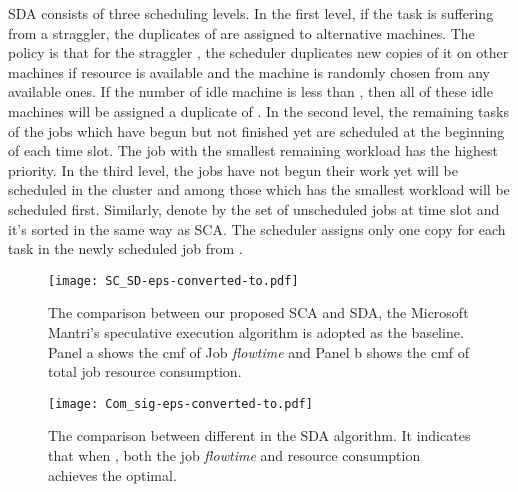 \documentclass[10pt,conference]{IEEEtran}
\begin{document}
SDA consists of three scheduling levels. In the  first level, if the task  is suffering from a straggler, the duplicates of  are assigned to alternative machines. The policy is that for the straggler  , the scheduler duplicates  new copies of it on other machines if resource is available and the machine is randomly chosen from any available ones. If the number of idle machine is less than , then all of these idle machines will be assigned a duplicate of . In the second level, the remaining tasks of the jobs which have begun but not finished yet are scheduled at the beginning of each time slot. The job with the smallest remaining workload has the highest priority. In the third level, the jobs have not begun their work yet will be scheduled in the cluster and among those which has the smallest workload will be scheduled first. Similarly, denote by  the set of unscheduled jobs at time slot  and it's sorted in the same way as SCA. The scheduler assigns only one copy for each task in the newly scheduled job from .


\begin{figure}
\centering
\texttt{[image: SC\_SD-eps-converted-to.pdf]}
\caption{The comparison between our proposed SCA and SDA, the Microsoft Mantri's speculative execution algorithm is adopted as the baseline.  Panel a shows the cmf of Job \textit{flowtime} and Panel b shows the cmf of total job resource consumption. }
\label{SDA}
\vspace{-0.2 cm}
\end{figure}

\begin{figure}
\centering
\texttt{[image: Com\_sig-eps-converted-to.pdf]}
\caption{The comparison between different  in the SDA algorithm. It indicates that when , both the job \textit{flowtime} and resource consumption achieves the optimal.}
\label{comparison}
\vspace{-0.2 cm}
\end{figure}
\end{document}
